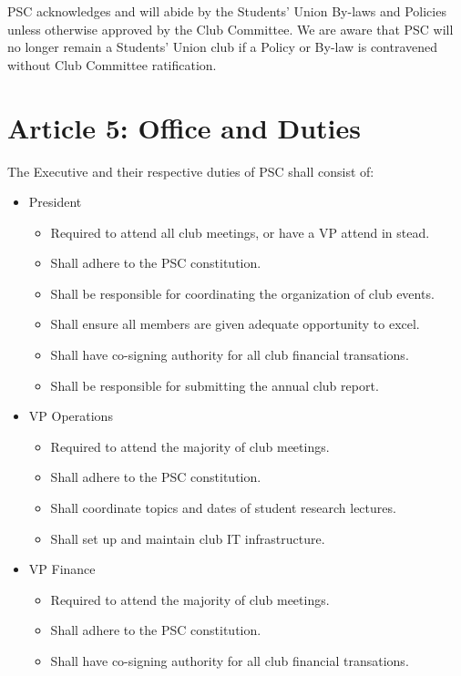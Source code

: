 \documentclass{article}
\begin{document}
PSC acknowledges and will abide by the Students' Union By-laws and Policies unless otherwise approved by the Club Committee.
We are aware that PSC will no longer remain a Students' Union club if a Policy or By-law is contravened without Club Committee ratification.

\section{Article 5: Office and Duties}

The Executive and their respective duties of PSC shall consist of:
\begin{itemize}
    \item President
        \begin{itemize}
            \item Required to attend all club meetings, or have a VP attend in stead.
            \item Shall adhere to the PSC constitution.
            \item Shall be responsible for coordinating the organization of club events.
            \item Shall ensure all members are given adequate opportunity to excel.
            \item Shall have co-signing authority for all club financial transations.
            \item Shall be responsible for submitting the annual club report.
        \end{itemize}
    \item VP Operations
        \begin{itemize}
            \item Required to attend the majority of club meetings.
            \item Shall adhere to the PSC constitution.
            \item Shall coordinate topics and dates of student research lectures.
            \item Shall set up and maintain club IT infrastructure.
        \end{itemize}
    \item VP Finance
        \begin{itemize}
            \item Required to attend the majority of club meetings.
            \item Shall adhere to the PSC constitution.
            \item Shall have co-signing authority for all club financial transations.

\end{itemize}
\end{itemize}
\end{document}
